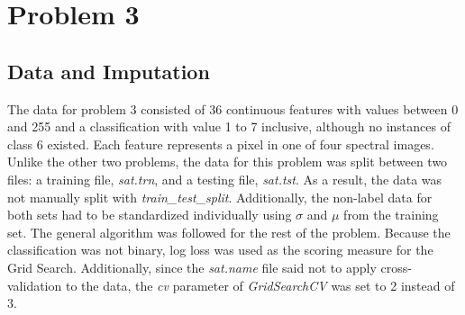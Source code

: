 \documentclass[12pt]{article}
\begin{document}
    \section{Problem 3}
    
    \subsection{Data and Imputation}
    The data for problem 3 consisted of 36 continuous features with values between 0 and 255 and a classification with value 1 to 7 inclusive, although no instances of class 6 existed. Each feature represents a pixel in one of four spectral images. Unlike the other two problems, the data for this problem was split between two files: a training file, \textit{sat.trn}, and a testing file, \textit{sat.tst}. As a result, the data was not manually split with \textit{train\_test\_split}. Additionally, the non-label data for both sets had to be standardized individually using $\sigma$ and $\mu$ from the training set. The general algorithm was followed for the rest of the problem. Because the classification was not binary, log loss was used as the scoring measure for the Grid Search. Additionally, since the \textit{sat.name} file said not to apply cross-validation to the data, the \textit{cv} parameter of \textit{GridSearchCV} was set to 2 instead of 3.
    
\end{document}

